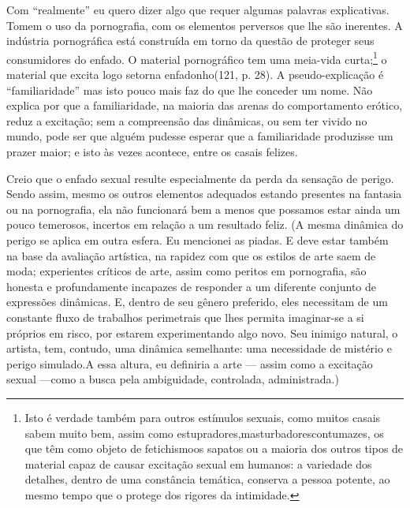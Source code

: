 Com ``realmente'' eu quero dizer algo que
requer algumas palavras explicativas. Tomem o uso da pornografia, com
os elementos perversos que lhe são inerentes. A indústria pornográfica
está construída em torno da questão de proteger seus consumidores do
enfado.\idxpornoenfa{} O material pornográfico tem uma meia-vida curta;\footnote{ Isto
é verdade também para outros estímulos sexuais, como muitos casais
sabem muito bem, assim como estupradores,\idxestup[|nn] masturbadores\idxmastur[|nn] contumazes, os
que têm como objeto de fetichismo\idxfetic[|nn] os sapatos ou a maioria dos outros
tipos de material capaz de causar excitação sexual em humanos: a
variedade dos detalhes, dentro de uma constância temática, conserva a
pessoa potente, ao mesmo tempo que o protege dos rigores da
intimidade.} o material que excita logo se\idxpornoenfa[|nn] torna enfadonho\idxenfafamil[|nn] (121, p. 28).
A pseudo-explicação é ``familiaridade'' mas
isto pouco mais faz do que lhe conceder um nome. Não explica por que a
familiaridade, na maioria das arenas do comportamento erótico, reduz a
excitação; sem a compreensão das dinâmicas, ou sem ter vivido no mundo,
pode ser que alguém pudesse esperar que a familiaridade produzisse um
prazer maior; e isto às vezes acontece, entre os casais felizes.

Creio que o enfado sexual resulte especialmente da perda da sensação
de perigo. Sendo assim, mesmo os outros elementos adequados estando
presentes na fantasia ou na pornografia, ela não funcionará bem a
menos que possamos estar ainda um pouco temerosos, incertos em relação
a um resultado feliz. (A mesma dinâmica do perigo se aplica em outra
esfera. Eu mencionei as piadas. E deve estar também na base da
avaliação artística, na rapidez com que os estilos de arte saem de
moda; experientes críticos de arte, assim como peritos em pornografia,
são honesta e profundamente incapazes de responder a um diferente
conjunto de expressões dinâmicas. E, dentro de seu gênero preferido,
eles necessitam de um constante fluxo de trabalhos perimetrais que lhes
permita imaginar-se a si próprios em risco, por estarem experimentando
algo novo. Seu inimigo natural, o artista, tem, contudo, uma dinâmica
semelhante: uma necessidade de mistério e perigo simulado.\idxenfa[|)] A essa
altura, eu definiria a arte --- assim como a excitação sexual ---\idxpervenfad[|)]
como a busca pela ambiguidade,\idxsexueamb{} controlada, administrada.)


